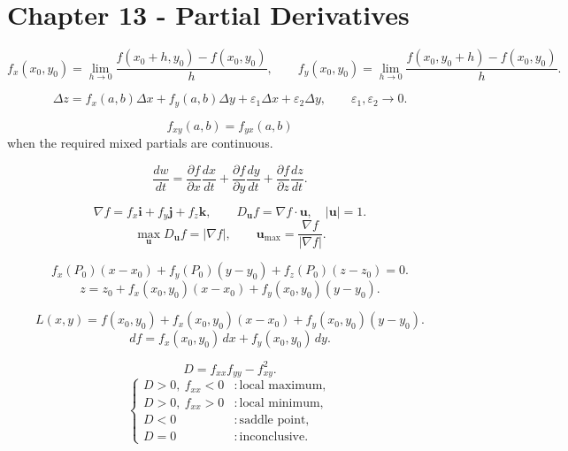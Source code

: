 
\section*{Chapter 13 - Partial Derivatives}

\[
  f_x(x_0,y_0)=\lim_{h\to0}\frac{f(x_0+h,y_0)-f(x_0,y_0)}h,
  \qquad
  f_y(x_0,y_0)=\lim_{h\to0}\frac{f(x_0,y_0+h)-f(x_0,y_0)}h.
\]

\[
  \Delta z=f_x(a,b)\Delta x+f_y(a,b)\Delta y+\varepsilon_1\Delta x+\varepsilon_2\Delta y,
  \qquad \varepsilon_1,\varepsilon_2\to0.
\]

\[
  f_{xy}(a,b)=f_{yx}(a,b)
\]
when the required mixed partials are continuous.

\[
  \frac{dw}{dt}
  =
  \frac{\partial f}{\partial x}\frac{dx}{dt}
  +
  \frac{\partial f}{\partial y}\frac{dy}{dt}
  +
  \frac{\partial f}{\partial z}\frac{dz}{dt}.
\]

\[
  \nabla f=f_x\mathbf i+f_y\mathbf j+f_z\mathbf k,
  \qquad
  D_{\mathbf u}f=\nabla f\cdot\mathbf u,
  \quad |\mathbf u|=1.
\]
\[
  \max_{\mathbf u}D_{\mathbf u}f=|\nabla f|,
  \qquad
  \mathbf u_{\max}=\frac{\nabla f}{|\nabla f|}.
\]

\[
  f_x(P_0)(x-x_0)+f_y(P_0)(y-y_0)+f_z(P_0)(z-z_0)=0.
\]
\[
  z=z_0+f_x(x_0,y_0)(x-x_0)+f_y(x_0,y_0)(y-y_0).
\]

\[
  L(x,y)=f(x_0,y_0)+f_x(x_0,y_0)(x-x_0)+f_y(x_0,y_0)(y-y_0).
\]
\[
  df=f_x(x_0,y_0)\,dx+f_y(x_0,y_0)\,dy.
\]

\[
  D=f_{xx}f_{yy}-f_{xy}^2.
\]
\[
  \begin{cases}
    D>0,\ f_{xx}<0 &: \text{local maximum},\\
    D>0,\ f_{xx}>0 &: \text{local minimum},\\
    D<0 &: \text{saddle point},\\
    D=0 &: \text{inconclusive}.
  \end{cases}
\]

